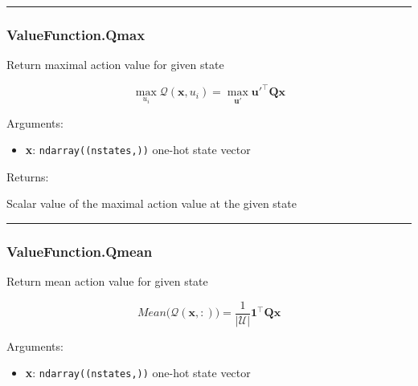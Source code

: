 \begin{center}\rule{0.5\linewidth}{\linethickness}\end{center}

\subsubsection{ValueFunction.Qmax}\label{valuefunction.qmax}

\begin{Shaded}
\begin{Highlighting}[]
\end{Highlighting}
\end{Shaded}

Return maximal action value for given state

\[
\max_{u_i}\mathcal Q(\mathbf x, u_i) = \max_{\mathbf u'} \mathbf u'^\top \mathbf Q \mathbf x
\]

Arguments:

\begin{itemize}
\tightlist
\item
  \textbf{x}: \texttt{ndarray((nstates,))} one-hot state vector
\end{itemize}

Returns:

Scalar value of the maximal action value at the given state

\begin{center}\rule{0.5\linewidth}{\linethickness}\end{center}

\subsubsection{ValueFunction.Qmean}\label{valuefunction.qmean}

\begin{Shaded}
\begin{Highlighting}[]
\end{Highlighting}
\end{Shaded}

Return mean action value for given state

\[
Mean \big(\mathcal Q(\mathbf x, :)\big) = \frac{1}{|\mathcal U|} \mathbf 1^\top \mathbf Q \mathbf x
\]

Arguments:

\begin{itemize}
\tightlist
\item
  \textbf{x}: \texttt{ndarray((nstates,))} one-hot state vector
\end{itemize}

